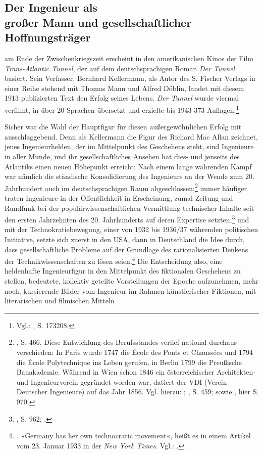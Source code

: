 \documentclass[%
	fontsize=10pt,%
	twoside,%
	headings=optiontoheadandtoc,%
	showtrims]{scrbook}
\begin{document}
\subsection[Der Ingenieur als    großer Mann und gesellschaftlicher    Hoffnungs\-träger]{Der Ingenieur als \- \protect\\ großer Mann und gesellschaftlicher\- \protect\\  Hoffnungs\-träger}
\par{} \textendash{} am Ende der Zwischenkriegszeit \textendash{} erscheint in den amerikanischen Kinos der Film \emph{Trans-Atlantic Tunnel}, der auf dem deutschsprachigen Roman \emph{Der Tunnel} basiert. Sein Verfasser, Bernhard Kellermann, als Autor des S. Fischer Verlags in einer Reihe stehend mit Thomas Mann und Alfred Döblin, landet mit diesem 1913 publizierten Text den Erfolg seines Lebens. \emph{Der Tunnel} wurde viermal verfilmt, in über 20 Sprachen übersetzt und erzielte bis 1943 373 Auflagen.\footnote{Vgl.: \cite[][]{segeberg1987a}, S. 173\textendash{}208.} \par Sicher war die Wahl der Hauptfigur für diesen außergewöhnlichen Erfolg mit ausschlaggebend. Denn als Kellermann die Figur des Richard Mac Allan zeichnet, jenes Ingenieurhelden, der im Mittelpunkt des Geschehens steht, sind Ingenieure in aller Munde, und ihr gesellschaftliches Ansehen hat dies- und jenseits des Atlantiks einen neuen Höhepunkt erreicht: Nach einem lange währenden Kampf war nämlich die ständische Konsolidierung des Ingenieurs an der Wende zum 20. Jahrhundert auch im deutschsprachigen Raum abgeschlossen;\footnote{\cite[][]{treue1967a}, S. 466. Diese Entwicklung des Berufsstandes verlief national durchaus verschieden: In Paris wurde 1747 die École des Ponts et Chaussées und 1794 die École Polytechnique ins Leben gerufen, in Berlin 1799 die Preußische Bauakademie. Während in Wien schon 1846 ein österreichischer Architekten- und Ingenieurverein gegründet worden war, datiert der VDI (Verein Deutscher Ingenieure) auf das Jahr 1856. Vgl. hierzu: \cite[][]{koenig2007a}; \cite[][]{treue1967a}, S. 459; sowie \cite[][]{popplow2007a}, hier S. 970.}  immer häufiger traten Ingenieure in der Öffentlichkeit in Erscheinung, zumal Zeitung und Rundfunk bei der populärwissenschaftlichen Vermittlung technischer Inhalte seit den ersten Jahrzehnten des 20. Jahrhunderts auf deren Expertise setzten,\footnote{\cite[][]{popplow2007a}, S. 962; \cite[][]{schirrmacher2013a}.}  und mit der Technokratiebewegung, einer von 1932 bis 1936/37 währenden politischen Initiative, setzte sich zuerst in den USA, dann in Deutschland die Idee durch, dass gesellschaftliche Probleme auf der Grundlage des rationalisierten Denkens der Technikwissenschaften zu lösen seien.\footnote{\cite[][]{willeke1995a}. »Germany has her own technocratic movement«, heißt es in einem Artikel vom 23. Januar 1933 in der \emph{New York Times}. Vgl.: \cite[][]{ov1933a}.}  Die Entscheidung also, eine heldenhafte Ingenieurfigur in den Mittelpunkt des fiktionalen Geschehens zu stellen, bedeutete, kollektiv geteilte Vorstellungen der Epoche aufzunehmen, mehr noch, kursierende Bilder vom Ingenieur im Rahmen künstlerischer Fiktionen, mit literarischen und filmischen Mitteln 
\end{document}
